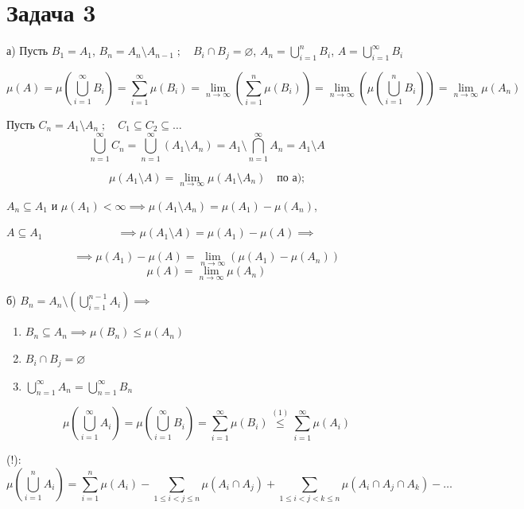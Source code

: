 \documentclass[12pt, a4paper]{article}
\begin{document}
\section*{Задача 3}

\noindent а) Пусть $B_1 = A_1$, $B_n = A_n \setminus A_{n-1} \; ; \quad B_i \cap B_j = \varnothing$, $A_n = \bigcup\limits_{i=1}^n B_i$, $A = \bigcup\limits_{i=1}^\infty B_i$

\[
\mu(A) = \mu\left(\bigcup_{i=1}^\infty B_i\right) = \sum_{i=1}^\infty \mu(B_i) = \lim_{n \to \infty} \left( \sum_{i=1}^n \mu(B_i) \right) = \lim_{n \to \infty} \left( \mu\left(\bigcup_{i=1}^n B_i\right) \right) = \lim_{n \to \infty} \mu(A_n)
\]

\bigskip

\noindent Пусть $C_n = A_1 \setminus A_n \; ; \quad C_1 \subseteq C_2 \subseteq \dots$
\[
\bigcup_{n=1}^\infty C_n = \bigcup_{n=1}^\infty (A_1 \setminus A_n) = A_1 \setminus \bigcap_{n=1}^\infty A_n = A_1 \setminus A
\]

\[
\mu(A_1 \setminus A) = \lim_{n \to \infty} \mu(A_1 \setminus A_n) \quad \text{по а);}
\]

\noindent $A_n \subseteq A_1$ и $\mu(A_1) < \infty \implies \mu(A_1 \setminus A_n) = \mu(A_1) - \mu(A_n)$,

\noindent $A \subseteq A_1 \phantom{\text{и }\mu(A_1) < \infty} \implies \mu(A_1 \setminus A) = \mu(A_1) - \mu(A) \implies$

\[
\implies \mu(A_1) - \mu(A) = \lim_{n \to \infty} (\mu(A_1) - \mu(A_n))
\]
\[
\mu(A) = \lim_{n \to \infty} \mu(A_n)
\]

\bigskip

\noindent б) $B_n = A_n \setminus \left( \bigcup\limits_{i=1}^{n-1} A_i \right) \implies$
\begin{enumerate}
    \item[(1)] $B_n \subseteq A_n \implies \mu(B_n) \le \mu(A_n)$
    \item[(2)] $B_i \cap B_j = \varnothing$
    \item[(3)] $\bigcup\limits_{n=1}^\infty A_n = \bigcup\limits_{n=1}^\infty B_n$
\end{enumerate}

\[
\mu\left(\bigcup_{i=1}^\infty A_i\right) = \mu\left(\bigcup_{i=1}^\infty B_i\right) = \sum_{i=1}^\infty \mu(B_i) \overset{(1)}{\le} \sum_{i=1}^\infty \mu(A_i)
\]

\bigskip

\noindent (!): 
\[
\mu\left(\bigcup_{i=1}^n A_i\right) = \sum_{i=1}^n \mu(A_i) - \sum_{1 \le i < j \le n} \mu(A_i \cap A_j) + \sum_{1 \le i < j < k \le n} \mu(A_i \cap A_j \cap A_k) - \dots
\]
\end{document}
